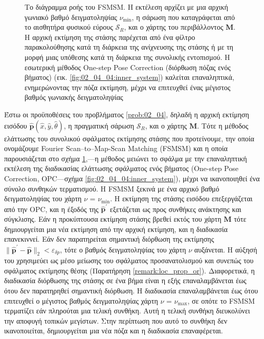 \begin{figure}[!h]\centering
  
  \caption{\small Το διάγραμμα ροής του FSMSM. Η εκτέλεση αρχίζει με μια αρχική
           γωνιακό βαθμό δειγματοληψίας $\nu_{\min}$, η σάρωση που καταγράφεται
           από το αισθητήρα φυσικού εύρους $\mathcal{S}_R$, και ο χάρτης του
           περιβάλλοντος $\bm{M}$. Η αρχική εκτίμηση της στάσης παρέχεται από
           ένα φίλτρο παρακολούθησης κατά τη διάρκεια της ανίχνευσης της στάσης
           ή με τη μορφή μιας υπόθεσης κατά τη διάρκεια της συνολικής
           εντοπισμού. Η εσωτερική μέθοδος One-step Pose Correction (διόρθωση
           πόζας ενός βήματος) (εικ. \ref{fig:02_04_04:inner_system}) καλείται
           επαναληπτικά, ενημερώνοντας την πόζα εκτίμηση, μέχρι να επιτευχθεί
           ένας μέγιστος βαθμός γωνιακής δειγματοληψίας}
  \label{fig:02_04_04:outer_system}
\end{figure}

Έστω οι προϋποθέσεις του προβλήματος \ref{prob:02_04}, δηλαδή
η αρχική εκτίμηση εισόδου $\hat{\bm{p}}(\hat{x}, \hat{y}, \hat{\theta})$,
η πραγματική σάρωση $\mathcal{S}_R$, και ο χάρτης $\bm{M}$. Τότε
η μέθοδος ελάττωσης του συνολικού σφάλματος εκτίμησης στάσης που προτείνουμε,
την οποία ονομάζουμε Fourier Scan--to--Map-Scan Matching (FSMSM) και η οποία
παρουσιάζεται στο σχήμα \ref{fig:02_04_04:outer_system},---η μέθοδος μειώνει το
σφάλμα με την επαναληπτική εκτέλεση της διαδικασίας ελάττωσης σφάλματος ενός
βήματος (One-step Pose Correction, OPC---σχήμα \ref{fig:02_04_04:inner_system}),
μέχρι να ικανοποιηθεί ένα σύνολο συνθηκών τερματισμού. Η FSMSM ξεκινά με ένα
αρχικό βαθμό δειγματοληψίας του χάρτη $\nu$ = $\nu_{\min}$. Η εκτίμηση της
στάσης εισόδου επεξεργάζεται από την OPC, και η έξοδός της
$\hat{\bm{p}}^\prime$ εξετάζεται ως προς συνθήκες ανάκτησης και
σύγκλισης. Εάν η προκύπτουσα εκτίμηση στάσης βρεθεί εκτός του χάρτη $\bm{M}$
τότε δημιουργείται μια νέα εκτίμηση από την αρχική
εκτίμηση, και η διαδικασία επανεκιννεί. Εάν δεν παρατηρείται σημαντική
διόρθωση της εκτίμησης
$\|\hat{\bm{p}}^\prime-\hat{\bm{p}}\|_2 < \varepsilon_{\delta p}$, τότε ο
βαθμός δειγματοληψίας του χάρτη $\nu$ αυξάνεται. Η αύξησή του χρησιμεύει ως
μέσο μείωσης του σφάλματος προσανατολισμού και συνεπώς του σφάλματος εκτίμησης
θέσης (Παρατήρηση \ref{remark:loc_prop_or}). Διαφορετικά, η διαδικασία
διόρθωσης της στάσης σε ένα βήμα είναι η εξής επαναλαμβάνεται έως ότου δεν
παρατηρηθεί σημαντική διόρθωση. Η διαδικασία επαναλαμβάνεται έως ότου
επιτευχθεί ο μέγιστος βαθμός δειγματοληψίας χάρτη $\nu$ = $\nu_{\max}$, σε
οπότε το FSMSM τερματίζει εάν πληρούται μια τελική συνθήκη. Αυτή η τελική
συνθήκη διευκολύνει την αποφυγή τοπικών μεγίστων. Στην περίπτωση που αυτό το
συνθήκη δεν ικανοποιείται, δημιουργείται μια νέα πόζα και η διαδικασία
επαναφέρεται.

